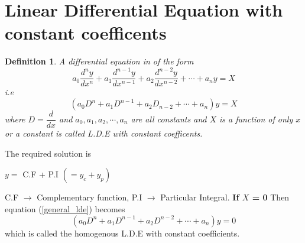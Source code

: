 \documentclass[a4paper, titlepage]{article}
\newtheorem{definition}{Definition}[section]
\begin{document}
    \section{Linear Differential Equation with constant coefficents}
    \begin{definition}
        A differential equation in of the form
        $$
            a_0\dfrac{d^ny}{dx^n} + a_1\dfrac{d^{n-1}y}{dx^{n-1}} + 
            a_2\dfrac{d^{n-2}y}{dx^{n-2}} + \cdots + a_ny = X
        $$
        i.e
        \begin{equation}\label{general_lde}
            \left(a_0D^n + a_1D^{n-1} + a_2D_{n-2} + \cdots + a_n\right)y = X
        \end{equation}
        where $ D = \dfrac{d}{dx} $ and $ a_0, a_1, a_2, \cdots, a_n $ are all constants
        and $X$ is a function of only $x$ or a constant is called L.D.E with constant coefficents.
    \end{definition}
    The required solution is 
    \begin{center}
        $ y =  $ C.F + P.I $( = y_c + y_p)$
    \end{center}
    C.F $\rightarrow$ Complementary function, P.I $\rightarrow$ Particular Integral.
    \textbf{If $X$ = 0} Then equation (\ref{general_lde}) becomes
    \begin{equation}\label{homogenous_general_lde}
        \left( a_0D^n + a_1D^{n-1} + a_2D^{n-2} + \cdots + a_n \right)y = 0
    \end{equation}
    which is called the homogenous L.D.E with constant coefficients.  
\end{document}
